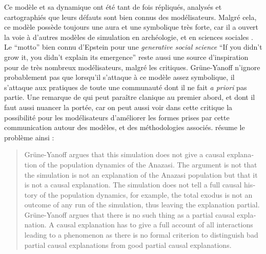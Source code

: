 Ce modèle et sa dynamique ont été tant de fois répliqués, analysés et cartographiés que leurs défauts sont bien connus des modélisateurs. Malgré cela, ce modèle possède toujours une aura et une symbolique très forte, car il a ouvert la voie à d'autres modèles de simulation en archéologie, et en sciences sociales \autocites{Janssen2009, Stonedahl2010, Schmitt2013}[151]{Schmitt2014}. 
Le \enquote{motto} bien connu d'Epstein pour une \textit{generative social science} \foreignquote{english}{If you didn't grow it, you didn't explain its emergence} \autocites{Epstein1996} reste aussi une source d'inspiration pour de très nombreux modélisateurs, malgré les critiques. Grüne-Yanoff n'ignore probablement pas que lorsqu'il s'attaque à ce modèle assez symbolique, il s'attaque aux pratiques de toute une communauté dont il ne fait \textit{a priori} pas partie. Une remarque de \textcite{Chattoe2011} qui peut paraître clanique au premier abord, et dont il faut aussi nuancer la portée, car on peut aussi voir dans cette critique la possibilité pour les modélisateurs d'améliorer les formes prises par cette communication autour des modèles, et des méthodologies associés. \textcite{Elsenbroich2012} résume le problème ainsi :

\foreignblockquote{english}[\cite{Elsenbroich2012}]{Grüne-Yanoff argues that this simulation does not give a causal explanation of the population dynamics of the Anazasi. The argument is not that the simulation is not an explanation of the Anazasi population but that it is not a causal explanation. The simulation does not tell a full causal history of the population dynamics, for example, the total exodus is not an outcome of any run of the simulation, thus leaving the explanation partial. Grüne-Yanoff argues that there is no such thing as a partial causal explanation. A causal explanation has to give a full account of all interactions leading to a phenomenon as there is no formal criterion to distinguish bad partial causal explanations from good partial causal explanations.}


